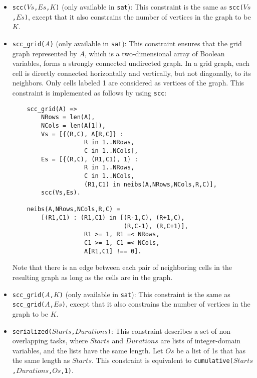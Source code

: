 \begin{itemize}
\item \texttt{scc($Vs$,$Es$,$K$)} (only available in \texttt{sat}):  This constraint is the same as \texttt{scc($Vs$,$Es$)}, except that it also constrains the number of vertices in the graph to be $K$. 

\item \texttt{scc\_grid($A$)} (only available in \texttt{sat}):  This constraint ensures that the grid graph represented by $A$, which is a two-dimensional array of Boolean variables, forms a strongly connected undirected graph. In a grid graph, each cell is directly connected horizontally and vertically, but not diagonally, to its neighbors. Only cells labeled 1 are considered as vertices of the graph. This constraint is implemented as follows by using \texttt{scc}:
\begin{verbatim}
    scc_grid(A) =>
        NRows = len(A),
        NCols = len(A[1]),
        Vs = [{(R,C), A[R,C]} : 
                    R in 1..NRows, 
                    C in 1..NCols],
        Es = [{(R,C), (R1,C1), 1} : 
                    R in 1..NRows, 
                    C in 1..NCols,
                    (R1,C1) in neibs(A,NRows,NCols,R,C)],
        scc(Vs,Es).

    neibs(A,NRows,NCols,R,C) = 
        [(R1,C1) : (R1,C1) in [(R-1,C), (R+1,C), 
                               (R,C-1), (R,C+1)],
                    R1 >= 1, R1 =< NRows,
                    C1 >= 1, C1 =< NCols, 
                    A[R1,C1] !== 0].
\end{verbatim}
Note that there is an edge between each pair of neighboring cells in the resulting graph as long as the cells are in the graph.

\item \texttt{scc\_grid($A$,$K$)} (only available in \texttt{sat}): This constraint is the same as \texttt{scc\_grid($A$,$Es$)}, except that it also constrains the number of vertices in the graph to be $K$. 

\item \texttt{serialized($Starts$,$Durations$)}: This constraint describes a set of non-overlapping tasks, where $Starts$ and $Durations$ are lists of integer-domain variables, and the lists have the same length. Let $Os$ be a list of 1s that has the same length as $Starts$. This constraint is equivalent to \texttt{cumulative($Starts$,$Durations$,$Os$,1)}.


\end{itemize}
